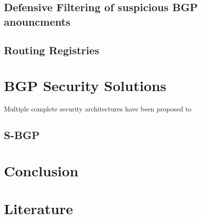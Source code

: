 \documentclass[12pt]{IEEEtran}
\begin{document}
	\subsection{Defensive Filtering of suspicious BGP anouncments}
%				

	\subsection{Routing Registries}
%			
			
	
	
			
				

	\section{BGP Security Solutions}
	Multiple complete security architectures have been proposed to 
	\subsection{S-BGP}
				
	\section{Conclusion}				

	
	\section{Literature}
\end{document}

